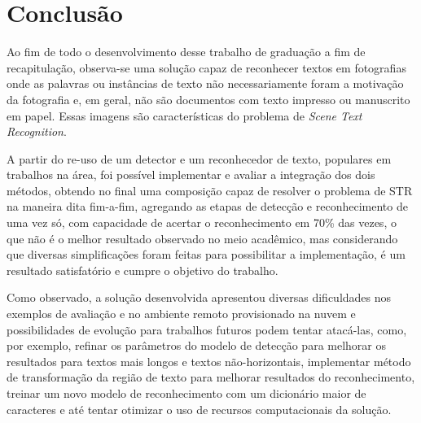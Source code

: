 \chapter{Conclusão}

Ao fim de todo o desenvolvimento desse trabalho de graduação a fim de recapitulação, observa-se uma solução capaz 
de reconhecer textos em fotografias onde as palavras ou instâncias de texto não necessariamente foram a motivação 
da fotografia e, em geral, não são documentos com texto impresso ou manuscrito em papel. Essas imagens são características 
do problema de \textit{Scene Text Recognition}.

A partir do re-uso de um detector e um reconhecedor de texto, populares em trabalhos na área, foi possível implementar 
e avaliar a integração dos dois métodos, obtendo no final uma composição capaz de resolver o problema de STR na 
maneira dita fim-a-fim, agregando as etapas de detecção e reconhecimento de uma vez só, com capacidade de acertar o 
reconhecimento em 70\% das vezes, o que não é o melhor resultado observado no meio acadêmico, mas considerando que diversas 
simplificações foram feitas para possibilitar a implementação, é um resultado satisfatório e cumpre o objetivo do trabalho.

Como observado, a solução desenvolvida apresentou diversas dificuldades nos exemplos de avaliação e no ambiente remoto 
provisionado na nuvem e possibilidades de evolução para trabalhos futuros podem tentar atacá-las, como, por exemplo, 
refinar os parâmetros do modelo de detecção para melhorar os resultados para textos mais longos e textos não-horizontais, 
implementar método de transformação da região de texto para melhorar resultados do reconhecimento, treinar um novo modelo de 
reconhecimento com um dicionário maior de caracteres e até tentar otimizar o uso de recursos computacionais da solução.
